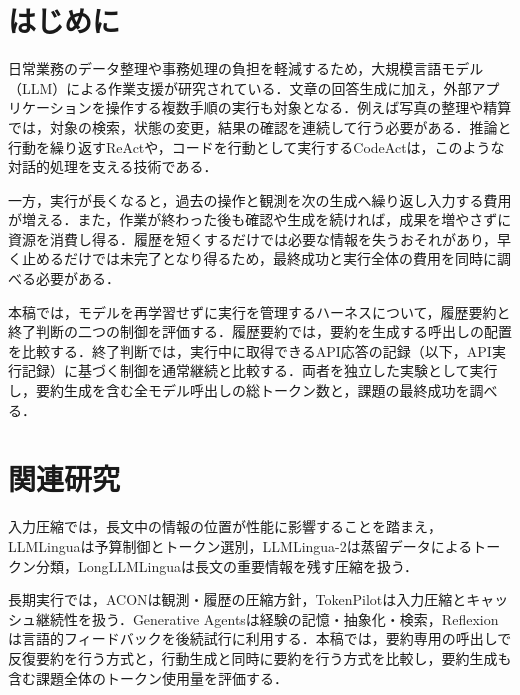 \documentclass[letter]{ieicej}
\begin{document}
\maketitle



\section{はじめに}

日常業務のデータ整理や事務処理の負担を軽減するため，大規模言語モデル（LLM）による作業支援が研究されている．文章の回答生成に加え，外部アプリケーションを操作する複数手順の実行も対象となる．例えば写真の整理や精算では，対象の検索，状態の変更，結果の確認を連続して行う必要がある．推論と行動を繰り返すReAct\cite{yao2023react}や，コードを行動として実行するCodeAct\cite{wang2024codeact}は，このような対話的処理を支える技術である．

一方，実行が長くなると，過去の操作と観測を次の生成へ繰り返し入力する費用が増える．また，作業が終わった後も確認や生成を続ければ，成果を増やさずに資源を消費し得る．履歴を短くするだけでは必要な情報を失うおそれがあり，早く止めるだけでは未完了となり得るため，最終成功と実行全体の費用を同時に調べる必要がある．

本稿では，モデルを再学習せずに実行を管理するハーネスについて，履歴要約と終了判断の二つの制御を評価する．履歴要約では，要約を生成する呼出しの配置を比較する．終了判断では，実行中に取得できるAPI応答の記録（以下，API実行記録）に基づく制御を通常継続と比較する．両者を独立した実験として実行し，要約生成を含む全モデル呼出しの総トークン数と，課題の最終成功を調べる．

\section{関連研究}

入力圧縮では，長文中の情報の位置が性能に影響すること\cite{liu2024lost}を踏まえ，LLMLingua\cite{jiang2023llmlingua}は予算制御とトークン選別，LLMLingua-2\cite{pan2024llmlingua2}は蒸留データによるトークン分類，LongLLMLingua\cite{jiang2024longllmlingua}は長文の重要情報を残す圧縮を扱う．

長期実行では，ACON\cite{kang2026acon}は観測・履歴の圧縮方針，TokenPilot\cite{xu2026tokenpilot}は入力圧縮とキャッシュ継続性を扱う．Generative Agents\cite{park2023generative}は経験の記憶・抽象化・検索，Reflexion\cite{shinn2023reflexion}は言語的フィードバックを後続試行に利用する．本稿では，要約専用の呼出しで反復要約を行う方式と，行動生成と同時に要約を行う方式を比較し，要約生成も含む課題全体のトークン使用量を評価する．
\end{document}
